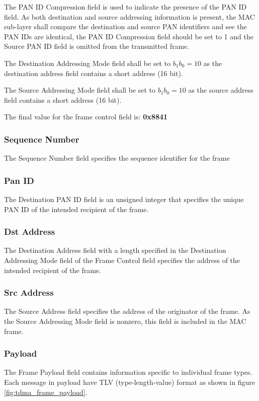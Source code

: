 \documentclass[\main/main.tex]{subfiles}
\begin{document}
The PAN ID Compression field is used to indicate the presence of the PAN ID field. As both destination and source addressing information is present, the MAC sub-layer shall compare the destination and source PAN identifiers and see the PAN IDs are identical, the PAN ID Compression field should be set to 1 and the Source PAN ID field is omitted from the transmitted frame. 

The Destination Addressing Mode field shall be set to  $b_1 b_0 = 10$ as the destination address field contains a short address (16 bit).

The Source Addressing Mode field shall be set to  $b_1 b_0 = 10$ as the source address field contains a short address (16 bit).

The final value for the frame control field is: \textbf{0x8841}
\subsubsection{Sequence Number}
The Sequence Number field specifies the sequence identifier for the frame

\subsubsection{Pan ID}
The Destination PAN ID field is an unsigned integer that specifies the unique PAN ID of the intended recipient of the frame. 

\subsubsection{Dst Address}
The Destination Address field with a length specified in the Destination Addressing Mode field of the Frame Control field specifies the address of the intended recipient of the frame.

\subsubsection{Src Address}
The Source Address field specifies the address of the originator of the frame. As the Source Addressing Mode field is nonzero, this field is included in the MAC frame.

\subsubsection{Payload}
The Frame Payload field contains information specific to individual frame types. Each message in payload have TLV (type-length-value) format as shown in figure \ref{fig:tdma_frame_payload}.
\end{document}
